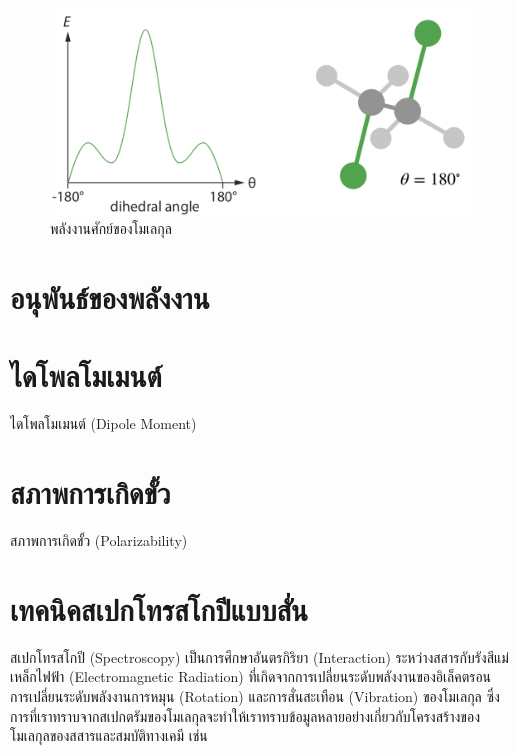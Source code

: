 \begin{figure}[htbp]
    \centering
    \includegraphics[width=0.8\linewidth]{fig/PES_C2H4Cl2.png}
    \caption{พลังงานศักย์ของโมเลกุล }
    \label{fig:pes_c2h4cl2}
\end{figure}

\section{อนุพันธ์ของพลังงาน}
\label{ssec:energy_der}

\section{ไดโพลโมเมนต์}
\label{sec:dipole_moment}

ไดโพลโมเมนต์ (Dipole Moment)


\section{สภาพการเกิดขั้ว}
\label{sec:polariz}

สภาพการเกิดขั้ว (Polarizability)

\section{เทคนิคสเปกโทรสโกปีแบบสั่น}
\label{sec:spectro}

สเปกโทรสโกปี (Spectroscopy) เป็นการศึกษาอันตรกิริยา (Interaction) ระหว่างสสารกับรังสีแม่เหล็กไฟฟ้า (Electromagnetic Radiation) 
ที่เกิดจากการเปลี่ยนระดับพลังงานของอิเล็คตรอน การเปลี่ยนระดับพลังงานการหมุน (Rotation) และการสั่นสะเทือน (Vibration) ของโมเลกุล 
ซึ่งการที่เราทราบจากสเปกตรัมของโมเลกุลจะทำให้เราทราบข้อมูลหลายอย่างเกี่ยวกับโครงสร้างของโมเลกุลของสสารและสมบัติทางเคมี เช่น

